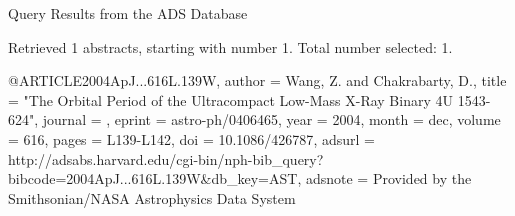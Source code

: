 Query Results from the ADS Database


Retrieved 1 abstracts, starting with number 1.  Total number selected: 1.

@ARTICLE{2004ApJ...616L.139W,
   author = {{Wang}, Z. and {Chakrabarty}, D.},
    title = "{The Orbital Period of the Ultracompact Low-Mass X-Ray Binary 4U 1543-624}",
  journal = {\apjl},
   eprint = {astro-ph/0406465},
     year = 2004,
    month = dec,
   volume = 616,
    pages = {L139-L142},
      doi = {10.1086/426787},
   adsurl = {http://adsabs.harvard.edu/cgi-bin/nph-bib_query?bibcode=2004ApJ...616L.139W&db_key=AST},
  adsnote = {Provided by the Smithsonian/NASA Astrophysics Data System}
}


